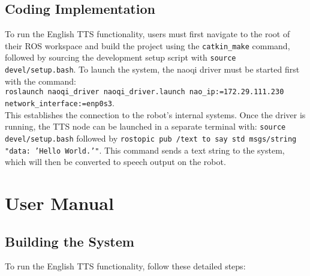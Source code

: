 \documentclass{CSSRforAfrica}
\begin{document}
\subsection{Coding Implementation}

To run the English TTS functionality, users must first navigate to the root of their ROS workspace and build the project using the \texttt{catkin\_make} command, followed by sourcing the development setup script with \texttt{source devel/setup.bash}.
To launch the system, the naoqi driver must be started first with the command: \\
\texttt{roslaunch naoqi\_driver naoqi\_driver.launch \newline nao\_ip:=172.29.111.230 network\_interface:=enp0s3}. \\ This establishes the connection to the robot's internal systems.
Once the driver is running, the TTS node can be launched in a separate terminal with: 
\texttt{source devel/setup.bash} followed by \texttt{rostopic pub /text to say std msgs/string "data: 'Hello World.'"}. This command sends a text string to the system, which will then be converted to speech output on the robot.     



\newpage

\section{User Manual}

\subsection{Building the System}

To run the English TTS functionality, follow these detailed steps:



\end{document}
